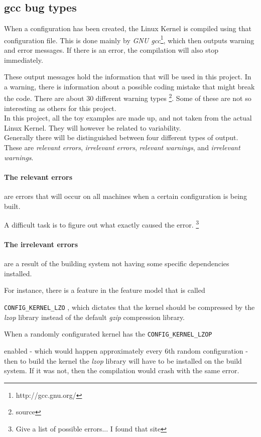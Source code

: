\documentclass[a4paper,11pt]{article}
\newcommand{\textcode}[1]{
    \texttt{\colorbox{gray!20}{#1}}
}
\begin{document}
\subsection{gcc bug types}

When a configuration has been created, the Linux Kernel is compiled using 
that configuration file. This is done mainly by \emph{GNU 
gcc}\footnote{http://gcc.gnu.org/}, which then outputs warning and error 
messages. If there is an error, the compilation will also stop immediately.

These output messages hold the information that will be used in this project. 
In a warning, there is information about a possible coding mistake that might 
break the code. There are about 30 different warning types \footnote{source}. 
Some of these are not so interesting as others for this project.\\


In this project, all the toy examples are made up, and not taken from the 
actual Linux Kernel. They will however be related to variability. \\


Generally there will be distinguished between four different types of output. 
These are \emph{relevant errors}, \emph{irrelevant errors}, \emph{relevant 
warnings}, and \emph{irrelevant warnings}. 


\paragraph{The relevant errors} are errors that will occur on all machines 
when a certain configuration is being built. 

A difficult task is to figure out what exactly caused the error. 
\footnote{Give a list of possible errors... I found that site}


\paragraph{The irrelevant errors} 
are a result of the building system not having some specific dependencies 
installed. 

For instance, there is a feature in the feature model that is called 
\textcode{CONFIG\_KERNEL\_LZO}, which dictates that the kernel should be 
compressed by the \emph{lzop} library instead of the default \emph{gzip} 
compression library.

When a randomly configurated kernel has the \textcode{CONFIG\_KERNEL\_LZOP} 
enabled - which would happen approximately every 6th random configuration - 
then to build the kernel the \emph{lzop} library will have to be installed on 
the build system. If it was not, then the compilation would crash with the 
same error. \\ 
\end{document}
